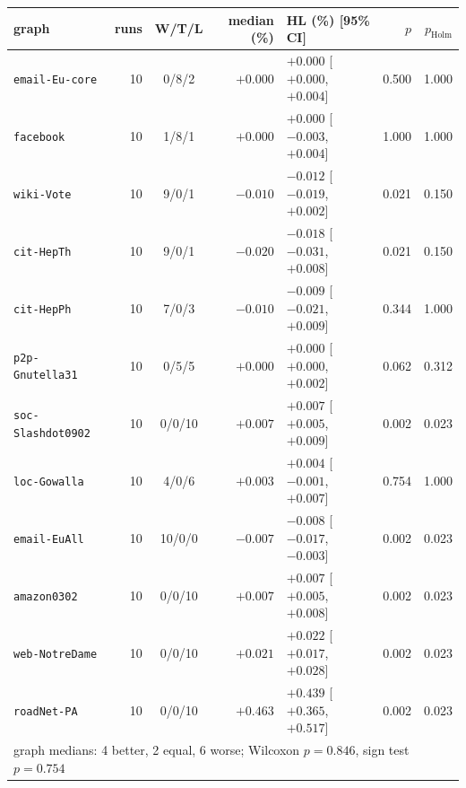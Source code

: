 \begin{tabular}{lrcrlrr}
\toprule
graph & runs & W/T/L & median (\%) & HL (\%) [95\% CI] & $p$ & $p_{\mathrm{Holm}}$ \\
\midrule
\texttt{email-Eu-core} & 10 & 0/8/2 & $+0.000$ & $+0.000$ [$+0.000$, $+0.004$] & 0.500 & 1.000 \\
\texttt{facebook} & 10 & 1/8/1 & $+0.000$ & $+0.000$ [$-0.003$, $+0.004$] & 1.000 & 1.000 \\
\texttt{wiki-Vote} & 10 & 9/0/1 & $-0.010$ & $-0.012$ [$-0.019$, $+0.002$] & 0.021 & 0.150 \\
\texttt{cit-HepTh} & 10 & 9/0/1 & $-0.020$ & $-0.018$ [$-0.031$, $+0.008$] & 0.021 & 0.150 \\
\texttt{cit-HepPh} & 10 & 7/0/3 & $-0.010$ & $-0.009$ [$-0.021$, $+0.009$] & 0.344 & 1.000 \\
\texttt{p2p-Gnutella31} & 10 & 0/5/5 & $+0.000$ & $+0.000$ [$+0.000$, $+0.002$] & 0.062 & 0.312 \\
\texttt{soc-Slashdot0902} & 10 & 0/0/10 & $+0.007$ & $+0.007$ [$+0.005$, $+0.009$] & 0.002 & 0.023 \\
\texttt{loc-Gowalla} & 10 & 4/0/6 & $+0.003$ & $+0.004$ [$-0.001$, $+0.007$] & 0.754 & 1.000 \\
\texttt{email-EuAll} & 10 & 10/0/0 & $-0.007$ & $-0.008$ [$-0.017$, $-0.003$] & 0.002 & 0.023 \\
\texttt{amazon0302} & 10 & 0/0/10 & $+0.007$ & $+0.007$ [$+0.005$, $+0.008$] & 0.002 & 0.023 \\
\texttt{web-NotreDame} & 10 & 0/0/10 & $+0.021$ & $+0.022$ [$+0.017$, $+0.028$] & 0.002 & 0.023 \\
\texttt{roadNet-PA} & 10 & 0/0/10 & $+0.463$ & $+0.439$ [$+0.365$, $+0.517$] & 0.002 & 0.023 \\
\midrule
\multicolumn{7}{l}{graph medians: 4 better, 2 equal, 6 worse; Wilcoxon $p=0.846$, sign test $p=0.754$} \\
\bottomrule
\end{tabular}
